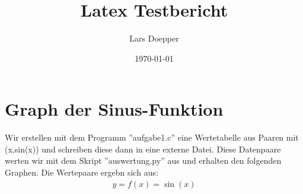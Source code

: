 \documentclass[12pt,a4paper,titlepage]{article}
\author{Lars Doepper}
\title{Latex Testbericht}
\begin{document}
	\date{\today}
\maketitle
\section{Graph der Sinus-Funktion}

Wir erstellen mit dem Programm ''aufgabe1.c'' eine Wertetabelle aus Paaren mit (x,sin(x)) und schreiben diese dann in eine externe Datei. Diese Datenpaare werten wir mit dem Skript ''auswertung.py'' aus und erhalten den folgenden Graphen. Die Wertepaare ergebn sich aus:
\begin{align}
	y = f(x) = \sin(x)
\end{align}
	
\end{document}
